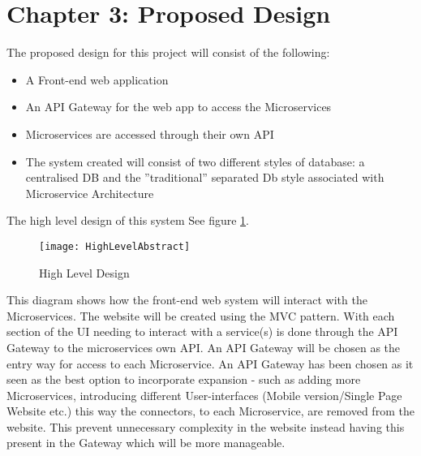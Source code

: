 \section{Chapter 3: Proposed Design}
The proposed design for this project will consist of the following:
\begin{itemize}
	\item A Front-end web application
	\item An API Gateway for the web app to access the Microservices
	\item Microservices are accessed through their own API
	\item The system created will consist of two different styles of database: a centralised DB and the ''traditional'' separated Db style associated with Microservice Architecture
\end{itemize}
The high level design of this system See figure \ref{fig:HighLvlAbstract}.
	\begin{figure}[h]	
		\caption{High Level Design}
		\label{fig:HighLvlAbstract}			
		\texttt{[image: HighLevelAbstract]}
	\end{figure}

This diagram shows how the front-end web system will interact with the Microservices. The website will be created using the MVC pattern. With each section of the UI needing to interact with a service(s) is done through the API Gateway to the microservices own API. 
An API Gateway will be chosen as the entry way for access to each Microservice. An API Gateway has been chosen as it seen as the best option to incorporate expansion - such as adding more Microservices, introducing different User-interfaces (Mobile version/Single Page Website etc.) this way the connectors, to each Microservice, are removed from the website. This prevent unnecessary complexity in the website instead having this present in the Gateway which will be more manageable.
 
